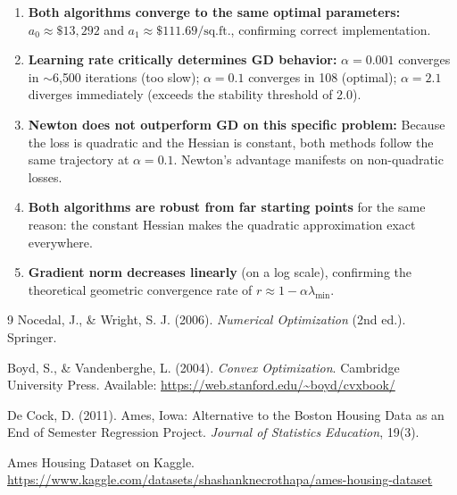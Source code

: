 \documentclass[12pt,a4paper]{article}
\begin{document}
\begin{enumerate}
    \item \textbf{Both algorithms converge to the same optimal parameters:}
    $a_0 \approx \$13{,}292$ and $a_1 \approx \$111.69/\text{sq.ft.}$, confirming
    correct implementation.

    \item \textbf{Learning rate critically determines GD behavior:} $\alpha = 0.001$
    converges in $\sim$6{,}500 iterations (too slow); $\alpha = 0.1$ converges in 108
    (optimal); $\alpha = 2.1$ diverges immediately (exceeds the stability threshold of 2.0).

    \item \textbf{Newton does not outperform GD on this specific problem:} Because the
    loss is quadratic and the Hessian is constant, both methods follow the same
    trajectory at $\alpha = 0.1$. Newton's advantage manifests on non-quadratic losses.

    \item \textbf{Both algorithms are robust from far starting points} for the same
    reason: the constant Hessian makes the quadratic approximation exact everywhere.

    \item \textbf{Gradient norm decreases linearly} (on a log scale), confirming the
    theoretical geometric convergence rate of $r \approx 1 - \alpha\lambda_{\min}$.
\end{enumerate}

\newpage
\begin{thebibliography}{9}
    Nocedal, J., \& Wright, S. J. (2006).
    \textit{Numerical Optimization} (2nd ed.). Springer.

    Boyd, S., \& Vandenberghe, L. (2004).
    \textit{Convex Optimization}. Cambridge University Press.
    Available: \url{https://web.stanford.edu/~boyd/cvxbook/}

    De Cock, D. (2011).
    Ames, Iowa: Alternative to the Boston Housing Data as an End of Semester
    Regression Project.
    \textit{Journal of Statistics Education}, 19(3).

    Ames Housing Dataset on Kaggle.
    \url{https://www.kaggle.com/datasets/shashanknecrothapa/ames-housing-dataset}
\end{thebibliography}
\end{document}
